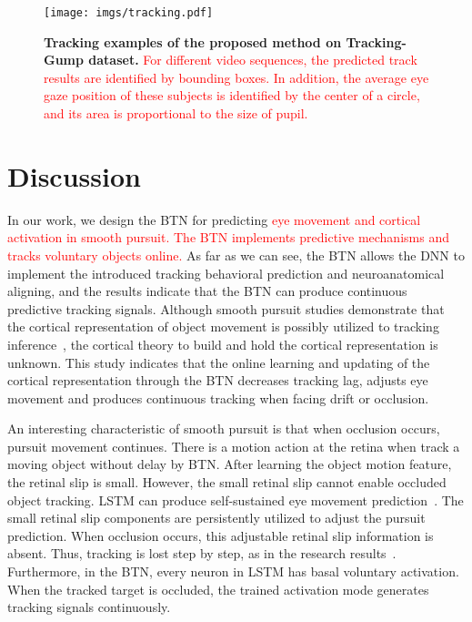 \documentclass[final,3p,times,twocolumn]{elsarticle}
\begin{document}
\begin{figure}[t]
	\centering
	\texttt{[image: imgs/tracking.pdf]}
	\caption{
		\textbf{
		Tracking examples of the proposed method on Tracking-Gump dataset. 
		}
		\textcolor{red}{
		For different video sequences, the predicted track results are identified by bounding boxes.
		In addition, the average eye gaze position of these subjects is identified by the center of a circle, and its area is proportional to the size of pupil.
		}
	}
	\label{fig:tracking}
\end{figure}


\section{Discussion}
\label{sec:discussion}

In our work, we design the BTN for predicting \textcolor{red}{eye movement and cortical activation in smooth pursuit.
The BTN implements predictive mechanisms and tracks voluntary objects online.}
As far as we can see, the BTN allows the DNN to implement the introduced tracking behavioral prediction and neuroanatomical aligning, 
and the results indicate that the BTN can produce continuous predictive tracking signals. 
Although smooth pursuit studies demonstrate that the cortical representation of object movement is possibly utilized to tracking inference~\cite{b21,b4,b3}, the cortical theory to build and hold the cortical representation is unknown. 
This study indicates that the online learning and updating of the cortical representation through the BTN decreases tracking lag, 
adjusts eye movement and produces continuous tracking when facing drift or occlusion.

An interesting characteristic of smooth pursuit is that when occlusion occurs, pursuit movement continues. 
There is a motion action at the retina when track a moving object without delay by BTN. 
After learning the object motion feature, the retinal slip is small. 
However, the small retinal slip cannot enable occluded object tracking. 
LSTM can produce self-sustained eye movement prediction~\cite{kashyap2018a}. 
The small retinal slip components are persistently utilized to adjust the pursuit prediction. 
When occlusion occurs, this adjustable retinal slip information is absent.
Thus, tracking is lost step by step, as in the research results~\cite{b4}. 
Furthermore, in the BTN, every neuron in LSTM has basal voluntary activation. 
When the tracked target is occluded, the trained activation mode generates tracking signals continuously. 
\end{document}
